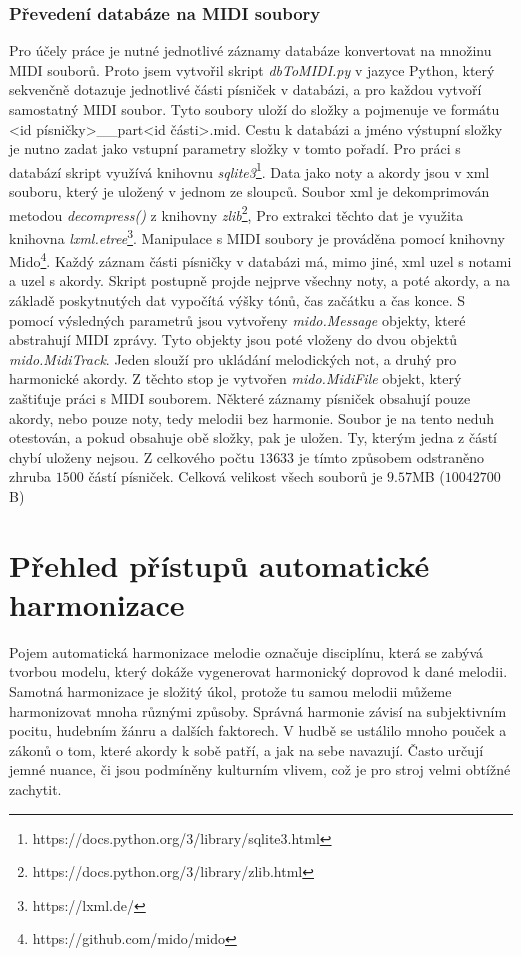 \subsection{Převedení databáze na MIDI soubory}
Pro účely práce je nutné jednotlivé záznamy databáze
konvertovat na množinu MIDI souborů.
Proto jsem vytvořil skript \emph{dbToMIDI.py} v jazyce Python,
který sekvenčně dotazuje jednotlivé části písniček v databázi,
a pro každou vytvoří samostatný MIDI soubor.
Tyto soubory uloží do složky 
a pojmenuje ve formátu {<id písničky>\_\_part<id části>.mid}.
Cestu k databázi a jméno výstupní složky 
je nutno zadat jako vstupní parametry složky v tomto pořadí.
Pro práci s databází skript využívá knihovnu \emph{sqlite3}\footnote{https://docs.python.org/3/library/sqlite3.html}.
Data jako noty a akordy jsou v xml souboru, 
který je uložený v jednom ze sloupců.
Soubor xml je dekomprimován metodou \emph{decompress()} z knihovny 
\emph{zlib}\footnote{https://docs.python.org/3/library/zlib.html},
Pro extrakci těchto dat je využita knihovna \emph{lxml.etree}\footnote{https://lxml.de/}.
Manipulace s MIDI soubory je prováděna pomocí knihovny Mido\footnote{https://github.com/mido/mido}.
Každý záznam části písničky v databázi má, mimo jiné, 
xml uzel s notami a uzel s akordy.
Skript postupně projde nejprve všechny noty, a poté akordy,
a na základě poskytnutých dat vypočítá výšky tónů, čas začátku a čas konce.
S pomocí výsledných parametrů jsou vytvořeny \emph{mido.Message} objekty,
které abstrahují MIDI zprávy.
Tyto objekty jsou poté vloženy do dvou objektů \emph{mido.MidiTrack}.
Jeden slouží pro ukládání melodických not, a druhý pro harmonické akordy.
Z těchto stop je vytvořen \emph{mido.MidiFile} objekt, který zaštiťuje práci s MIDI souborem.
Některé záznamy písniček obsahují pouze akordy, nebo pouze noty, tedy melodii bez harmonie.
Soubor je na tento neduh otestován, a pokud obsahuje obě složky, pak je uložen.
Ty, kterým jedna z částí chybí uloženy nejsou.
Z celkového počtu $13 633$ je tímto způsobem odstraněno zhruba $1500$ částí písniček.
Celková velikost všech souborů je $9.57$MB ($10 042 700$B)

\chapter{Přehled přístupů automatické harmonizace}
\label{prehledPristupus}
Pojem automatická harmonizace melodie označuje disciplínu, která se zabývá tvorbou modelu, 
který dokáže vygenerovat harmonický doprovod k dané melodii.
Samotná harmonizace je složitý úkol, 
protože tu samou melodii můžeme harmonizovat mnoha různými způsoby.
Správná harmonie závisí na subjektivním pocitu, hudebním žánru a dalších faktorech.
V hudbě se ustálilo mnoho pouček a zákonů o tom, které akordy k sobě patří,
a jak na sebe navazují.
Často určují jemné nuance, či jsou podmíněny kulturním vlivem, 
což je pro stroj velmi obtížné zachytit.
\cite{YinCheng_comparativeStudy}
\par

